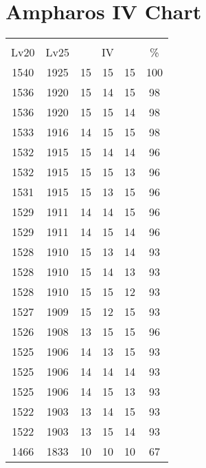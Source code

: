 \documentclass{article}%
\begin{document}
%
\normalsize%
\section{Ampharos IV Chart}%
\label{sec:Ampharos IV Chart}%
\renewcommand{\arraystretch}{1.5}%
\begin{tabular}{|c|c|c|c|c|c|}%
\hline%
\multicolumn{6}{|c|}{\textcolor{white}{ 
\linebreak{Ampharos}
}%
\cellcolor{black}}\\%
\multicolumn{1}{|c}{Lv20}&\multicolumn{1}{c|}{Lv25}&\multicolumn{3}{c|}{IV}&\multicolumn{1}{|c|}{\%}\\%
\hline%
\rowcolor{color100}%
1540&1925&15&15&15&100\\%
\hline%
\rowcolor{color98}%
1536&1920&15&14&15&98\\%
\hline%
\rowcolor{color98}%
1536&1920&15&15&14&98\\%
\hline%
\rowcolor{color98}%
1533&1916&14&15&15&98\\%
\hline%
\rowcolor{color96}%
1532&1915&15&14&14&96\\%
\hline%
\rowcolor{color96}%
1532&1915&15&15&13&96\\%
\hline%
\rowcolor{color96}%
1531&1915&15&13&15&96\\%
\hline%
\rowcolor{color96}%
1529&1911&14&14&15&96\\%
\hline%
\rowcolor{color96}%
1529&1911&14&15&14&96\\%
\hline%
\rowcolor{color93}%
1528&1910&15&13&14&93\\%
\hline%
\rowcolor{color93}%
1528&1910&15&14&13&93\\%
\hline%
\rowcolor{color93}%
1528&1910&15&15&12&93\\%
\hline%
\rowcolor{color93}%
1527&1909&15&12&15&93\\%
\hline%
\rowcolor{color96}%
1526&1908&13&15&15&96\\%
\hline%
\rowcolor{color93}%
1525&1906&14&13&15&93\\%
\hline%
\rowcolor{color93}%
1525&1906&14&14&14&93\\%
\hline%
\rowcolor{color93}%
1525&1906&14&15&13&93\\%
\hline%
\rowcolor{color93}%
1522&1903&13&14&15&93\\%
\hline%
\rowcolor{color93}%
1522&1903&13&15&14&93\\%
\hline%
\rowcolor{color91}%
1466&1833&10&10&10&67\\%
\end{tabular}

%
\end{document}
